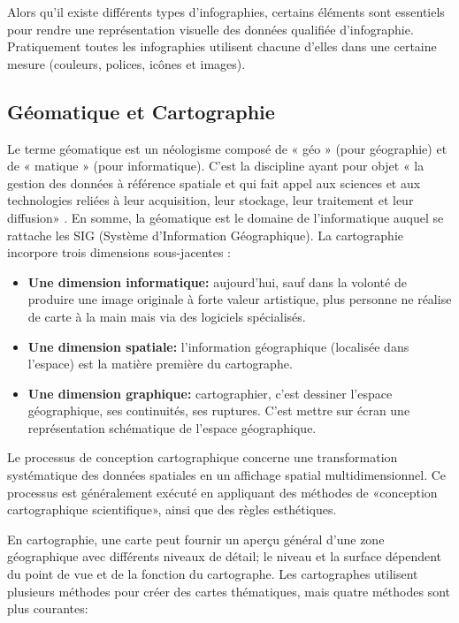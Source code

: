 \documentclass[french, a4paper, 12pt]{report}
\begin{document}
Alors qu'il existe différents types d'infographies, certains éléments sont essentiels pour rendre une représentation visuelle des données qualifiée d'infographie. Pratiquement toutes les infographies utilisent chacune d’elles dans une certaine mesure (couleurs, polices, icônes et images).

\subsection{Géomatique et Cartographie}
Le terme géomatique est un néologisme composé de « géo » (pour géographie) et de « matique » (pour informatique). C’est la discipline ayant pour objet « la gestion des données à référence spatiale et qui fait appel aux sciences et aux technologies reliées à leur acquisition, leur stockage, leur traitement et leur diffusion» \cite{11}. En somme, la géomatique est le domaine de l’informatique auquel se rattache les SIG (Système d’Information Géographique). La cartographie incorpore trois dimensions sous-jacentes \cite{11}:

\begin{itemize}
\item \textbf{Une dimension informatique:}  aujourd’hui, sauf dans la volonté de produire une image originale à forte valeur artistique, plus personne ne réalise de carte à la main mais via des logiciels spécialisés. 
\item \textbf{Une dimension spatiale:}  l’information géographique (localisée dans l’espace) est la matière première du cartographe. 
\item \textbf{ Une dimension graphique:} cartographier, c’est dessiner l’espace géographique, ses continuités, ses ruptures. C’est mettre sur écran une représentation schématique de l’espace géographique.
\end{itemize} 
Le processus de conception cartographique concerne une transformation systématique des données spatiales en un affichage spatial multidimensionnel. Ce processus est généralement exécuté en appliquant des méthodes de «conception cartographique scientifique», ainsi que des règles esthétiques.

En cartographie, une carte peut fournir un aperçu général d’une zone géographique avec différents niveaux de détail; le niveau et la surface dépendent du point de vue et de la fonction du cartographe. Les cartographes utilisent plusieurs méthodes pour créer des cartes thématiques, mais quatre méthodes sont plus courantes:
\end{document}
